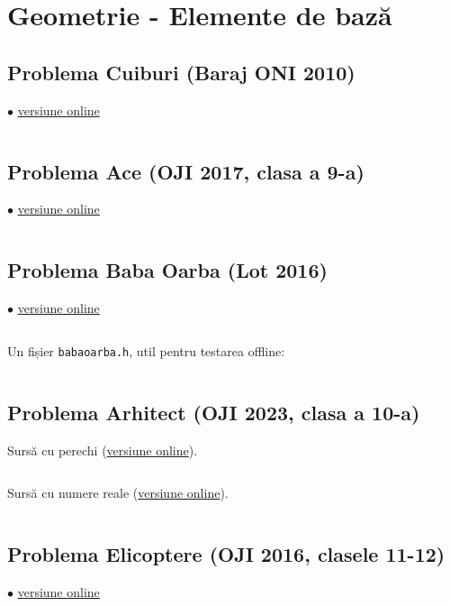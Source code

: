\documentclass[../main.tex]{subfiles}
\begin{document}
\chapter{Geometrie - Elemente de bază}

\section{Problema Cuiburi (Baraj ONI 2010)}
\label{code:cuiburi}
$\bullet$
\href{https://kilonova.ro/submissions/245388}{versiune online}

\inputminted{cpp}{../src/geometry/cuiburi.cpp}

\section{Problema Ace (OJI 2017, clasa a 9-a)}
\label{code:ace}
$\bullet$
\href{https://kilonova.ro/submissions/654927}{versiune online}

\inputminted{cpp}{../src/geometry/ace.cpp}

\section{Problema Baba Oarba (Lot 2016)}
\label{code:babaoarba}
$\bullet$
\href{https://kilonova.ro/submissions/258418}{versiune online}

\inputminted{cpp}{../src/geometry/babaoarba.cpp}

Un fișier \texttt{babaoarba.h}, util pentru testarea offline:

\inputminted{cpp}{../src/geometry/babaoarba.h}

\section{Problema Arhitect (OJI 2023, clasa a 10-a)}
\label{code:arhitect}

Sursă cu perechi (\href{https://kilonova.ro/submissions/655194}{versiune online}).

\inputminted{cpp}{../src/geometry/arhitect-1.cpp}

Sursă cu numere reale (\href{https://kilonova.ro/submissions/655188}{versiune online}).

\inputminted{cpp}{../src/geometry/arhitect-2.cpp}

\section{Problema Elicoptere (OJI 2016, clasele 11-12)}
\label{code:elicoptere}
$\bullet$
\href{https://kilonova.ro/submissions/647311}{versiune online}
\end{document}
